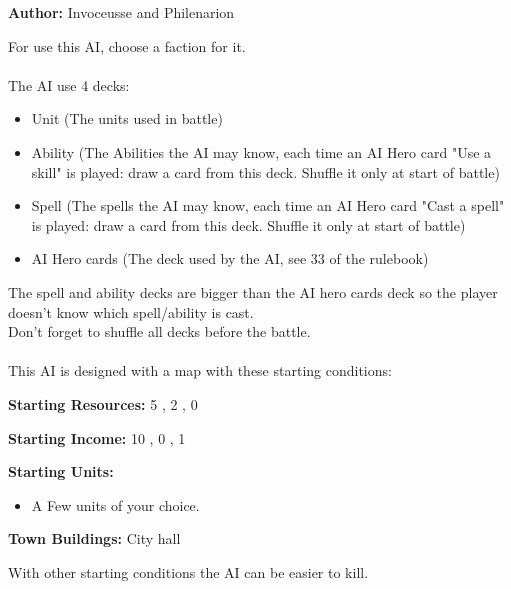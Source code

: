  
\textbf{Author:} Invoceusse and Philenarion

For use this AI, choose a faction for it.\\
\\

The AI use 4 decks:
\begin{itemize}
    \item Unit (The units used in battle)
    \item Ability (The Abilities the AI may know, each time an AI Hero card "Use a skill" is played: draw a card from this deck. Shuffle it only at start of battle)
    \item Spell (The spells the AI may know, each time an AI Hero card "Cast a spell" is played: draw a card from this deck. Shuffle it only at start of battle)
    \item AI Hero cards (The deck used by the AI, see 33 of the rulebook)
\end{itemize}


The spell and ability decks are bigger than the AI hero cards deck so the player doesn't know which spell/ability is cast. \\
Don’t forget to shuffle all decks before the battle.\\
\\

This AI is designed with a map with these starting conditions:

\textbf{Starting Resources:} 5 , 2 , 0 

\textbf{Starting Income:} 10 , 0 , 1 

\textbf{Starting Units:}
\begin{itemize}
    \item A Few  units of your choice.
\end{itemize}

\textbf{Town Buildings:} City hall

With other starting conditions the AI can be easier to kill. 

\newpage

